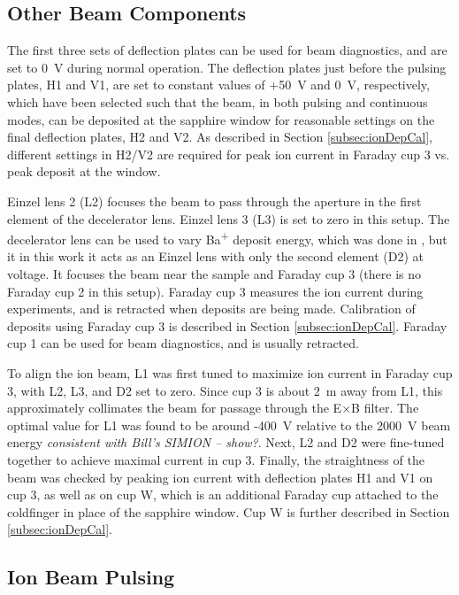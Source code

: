 \subsection{Other Beam Components}

The first three sets of deflection plates can be used for beam diagnostics, and are set to 0~V during normal operation.  The deflection plates just before the pulsing plates, H1 and V1, are set to constant values of +50~V and 0~V, respectively, which have been selected such that the beam, in both pulsing and continuous modes, can be deposited at the sapphire window for reasonable settings on the final deflection plates, H2 and V2.  As described in Section \ref{subsec:ionDepCal}, different settings in H2/V2 are required for peak ion current in Faraday cup 3 vs. peak deposit at the window.

Einzel lens 2 (L2) focuses the beam to pass through the aperture in the first element of the decelerator lens.  Einzel lens 3 (L3) is set to zero in this setup.  The decelerator lens can be used to vary Ba\textsuperscript{+} deposit energy, which was done in \cite{Shon}, but it in this work it acts as an Einzel lens with only the second element (D2) at voltage.  It focuses the beam near the sample and Faraday cup 3 (there is no Faraday cup 2 in this setup).  Faraday cup 3 measures the ion current during experiments, and is retracted when deposits are being made.  Calibration of deposits using Faraday cup 3 is described in Section \ref{subsec:ionDepCal}.  Faraday cup 1 can be used for beam diagnostics, and is usually retracted.  

To align the ion beam, L1 was first tuned to maximize ion current in Faraday cup 3, with L2, L3, and D2 set to zero.  Since cup 3 is about 2~m away from L1, this approximately collimates the beam for passage through the E$\times$B filter.  The optimal value for L1 was found to be around -400~V relative to the 2000~V beam energy \emph{\color{red}consistent with Bill's SIMION -- show?}.  Next, L2 and D2 were fine-tuned together to achieve maximal current in cup 3.  Finally, the straightness of the beam was checked by peaking ion current with deflection plates H1 and V1 on cup 3, as well as on cup W, which is an additional Faraday cup attached to the coldfinger in place of the sapphire window.  Cup W is further described in Section \ref{subsec:ionDepCal}.


\subsection{Ion Beam Pulsing}

